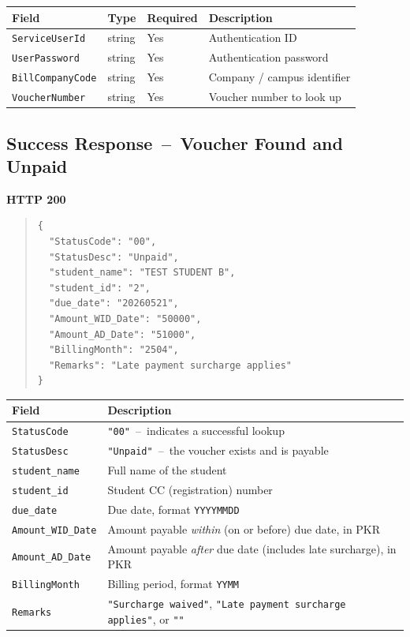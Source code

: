 \documentclass[11pt]{article}
\begin{document}
\begin{center}
\begin{tabular}{@{}llll@{}}
\toprule
\textbf{Field} & \textbf{Type} & \textbf{Required} & \textbf{Description} \\
\midrule
\texttt{ServiceUserId} & string & Yes & Authentication ID \\
\texttt{UserPassword} & string & Yes & Authentication password \\
\texttt{BillCompanyCode} & string & Yes & Company / campus identifier \\
\texttt{VoucherNumber} & string & Yes & Voucher number to look up \\
\bottomrule
\end{tabular}
\end{center}

\subsection{Success Response \,--\, Voucher Found and Unpaid}
\textbf{HTTP 200}

\begin{quote}
\begin{verbatim}
{
  "StatusCode": "00",
  "StatusDesc": "Unpaid",
  "student_name": "TEST STUDENT B",
  "student_id": "2",
  "due_date": "20260521",
  "Amount_WID_Date": "50000",
  "Amount_AD_Date": "51000",
  "BillingMonth": "2504",
  "Remarks": "Late payment surcharge applies"
}
\end{verbatim}
\end{quote}

\begin{center}
\begin{tabular}{@{}ll@{}}
\toprule
\textbf{Field} & \textbf{Description} \\
\midrule
\texttt{StatusCode} & \texttt{"00"} \,--\, indicates a successful lookup \\
\texttt{StatusDesc} & \texttt{"Unpaid"} \,--\, the voucher exists and is payable \\
\texttt{student\_name} & Full name of the student \\
\texttt{student\_id} & Student CC (registration) number \\
\texttt{due\_date} & Due date, format \texttt{YYYYMMDD} \\
\texttt{Amount\_WID\_Date} & Amount payable \emph{within} (on or before) due date, in PKR \\
\texttt{Amount\_AD\_Date} & Amount payable \emph{after} due date (includes late surcharge), in PKR \\
\texttt{BillingMonth} & Billing period, format \texttt{YYMM} \\
\texttt{Remarks} & \texttt{"Surcharge waived"}, \texttt{"Late payment surcharge applies"}, or \texttt{""} \\
\bottomrule
\end{tabular}
\end{center}
\end{document}
